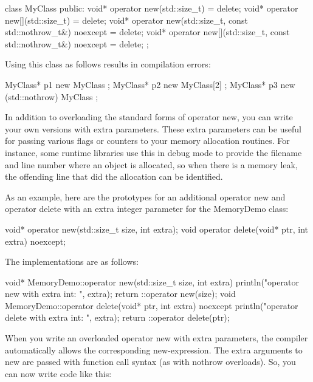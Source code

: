\begin{cpp}
class MyClass
{
    public:
        void* operator new(std::size_t) = delete;
        void* operator new[](std::size_t) = delete;
        void* operator new(std::size_t, const std::nothrow_t&) noexcept = delete;
        void* operator new[](std::size_t, const std::nothrow_t&) noexcept = delete;
};
\end{cpp}

Using this class as follows results in compilation errors:

\begin{cpp}
MyClass* p1 { new MyClass };
MyClass* p2 { new MyClass[2] };
MyClass* p3 { new (std::nothrow) MyClass };
\end{cpp}


In addition to overloading the standard forms of operator new, you can write your own versions with extra parameters. These extra parameters can be useful for passing various flags or counters to your memory allocation routines. For instance, some runtime libraries use this in debug mode to provide the filename and line number where an object is allocated, so when there is a memory leak, the offending line that did the allocation can be identified.

As an example, here are the prototypes for an additional operator new and operator delete with an extra integer parameter for the MemoryDemo class:

\begin{cpp}
void* operator new(std::size_t size, int extra);
void operator delete(void* ptr, int extra) noexcept;
\end{cpp}

The implementations are as follows:

\begin{cpp}
void* MemoryDemo::operator new(std::size_t size, int extra)
{
    println("operator new with extra int: {}", extra);
    return ::operator new(size);
}
void MemoryDemo::operator delete(void* ptr, int extra) noexcept
{
    println("operator delete with extra int: {}", extra);
    return ::operator delete(ptr);
}
\end{cpp}

When you write an overloaded operator new with extra parameters, the compiler automatically allows the corresponding new-expression. The extra arguments to new are passed with function call syntax (as with nothrow overloads). So, you can now write code like this:

